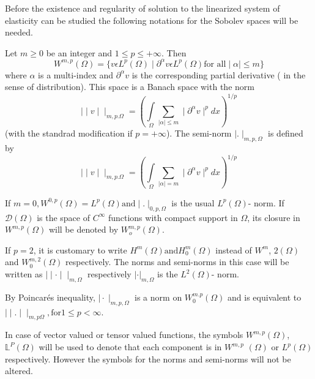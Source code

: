  Before the existence and regularity of solution to the linearized
 system of elasticity can be studied the following notations for the
 Sobolev spaces will be needed. 
 
Let $m \geq 0$ be an integer and $1 \leq p \leq + \infty$. Then 
 \begin{equation*}
   W^{m,p}(\Omega) = \{v \epsilon L^p (\Omega)\mid \partial^\alpha
   v \epsilon L^p (\Omega) \text{for all} \mid \alpha \mid \leq m
   \} \tag{2.2-12} \label{eq2.2-12}
\end{equation*}
where $\alpha$ is a multi-index and $\partial^\alpha v$ is the
 corresponding partial derivative ( in the sense of
 distribution). This space is a Banach space with the norm   
 \begin{equation*}
 \mid \mid v \mid \mid _{m, p.\Omega} = \left(\int\limits_\Omega \sum_{\mid
   \alpha \mid \le m} \mid \partial^\alpha v \mid ^p
 dx\right)^{1/p}\tag{2.2-13} \label{eq2.2-13}
 \end{equation*}\pageoriginale
  (with the standrad modification if $p=+\infty$). The semi-norm
 $\mid. \mid_{m, p, \Omega}$ is defined by   
  \begin{equation*}
    \mid \mid v \mid \mid _{m, p.\Omega} = \left(\int\limits_\Omega \sum_{\mid
      \alpha \mid = m} \mid \partial^\alpha v \mid ^p
    dx\right)^{1/p}\tag{2.2-14} \label{eq2.2-14}
  \end{equation*} 
  
 If $m=0, W^{0,p}(\Omega)= L^p (\Omega) \text{and} \mid .\mid _{0, p,
   \Omega}$ is the usual $L^p(\Omega)$- norm. If $\mathscr{D}(\Omega)$
 is the space of $C^\infty$ functions with compact support in
 $\Omega$, its closure in $W^{m ,p} (\Omega)$ will be denoted by
 $W^{m,p}_o(\Omega)$.  
  
 If $p=2$, it is customary to write $H^m(\Omega)
 \text{and}H^m_0(\Omega)$ instead of $W^m$, $2(\Omega)$
 and $W^{m,2}_0(\Omega)$ respectively. The norms and semi-norms
 in this case will be written as $\mid \mid \cdot \mid \mid _{m, \Omega}$
 respectively $| \cdot | _{m, \Omega}$ is the $L^2(\Omega)$- norm. 
 
 By Poincar\'es inequality, $\mid \cdot \mid _{m,p,\Omega}$ is a norm on
 $W^{m.p}_0(\Omega)$ and is equivalent to $\mid \mid . \mid \mid
 _{m,p\Omega}, \text {for} 1\leq p < \infty$. 
 
 In case of vector valued or tensor valued functions, the symbols
 $W^{m,p}(\Omega)$, $\mathbb{L}^P(\Omega)$ will be used to denote that
 each component is in $W^{m,p}$ $(\Omega)$ or $L^p(\Omega)$
 respectively. However the symbols for the norms and semi-norms will
 not be altered.  
 
